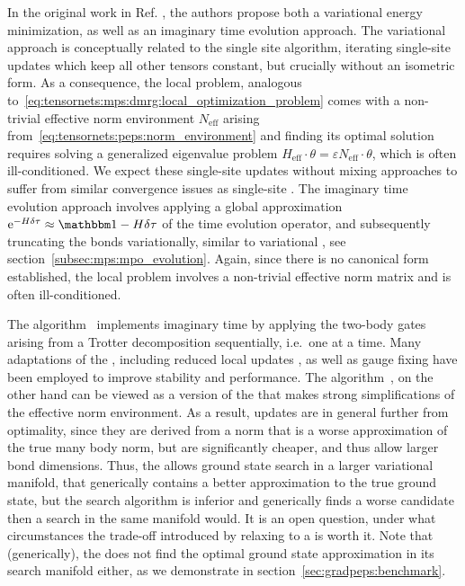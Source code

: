 In the original  work in Ref. \cite{verstraete2004}, the authors propose both a  variational energy minimization, as well as an imaginary time evolution approach.
%
The variational approach is conceptually related to the single site  algorithm, iterating single-site updates which keep all other tensors constant, but crucially without an isometric form.
%
As a consequence, the local problem, analogous to~\eqref{eq:tensornets:mps:dmrg:local_optimization_problem} comes with a non-trivial effective norm environment $N_\text{eff}$ arising from~\eqref{eq:tensornets:peps:norm_environment} and finding its optimal solution requires solving a generalized eigenvalue problem $H_\text{eff} \cdot \theta = \varepsilon N_\text{eff} \cdot \theta$, which is often ill-conditioned.
%
We expect these single-site updates without mixing approaches to suffer from similar convergence issues as single-site .
%
The imaginary time evolution approach involves applying a global approximation $\eto{-H\delta\tau} \approx \eye - H \delta\tau$ of the time evolution operator, and subsequently truncating the  bonds variationally, similar to variational , see section~\ref{subsec:mps:mpo_evolution}.
%
Again, since there is no canonical form established, the local problem involves a non-trivial effective norm matrix and is often ill-conditioned.



The  algorithm~\cite{jordan2008} implements imaginary time by applying the two-body gates arising from a Trotter decomposition sequentially, i.e.~one at a time.
%
Many adaptations of the , including reduced local updates \cite{corboz2010, lubasch2014a}, as well as gauge fixing \cite{lubasch2014, phien2015} have been employed to improve stability and performance.
%
The  algorithm~\cite{jiang2008}, on the other hand can be viewed as a version of the  that makes strong simplifications of the effective norm environment.
%
As a result, updates are in general further from optimality, since they are derived from a norm that is a worse approximation of the true many body norm, but are significantly cheaper, and thus allow larger bond dimensions.
%
Thus, the  allows ground state search in a larger variational manifold, that generically contains a better approximation to the true ground state, but the search algorithm is inferior and generically finds a worse candidate then a  search in the same manifold would.
%
It is an open question, under what circumstances the trade-off introduced by relaxing to a  is worth it.
%
Note that (generically), the  does not find the optimal ground state approximation in its search manifold either, as we demonstrate in section~\ref{sec:gradpeps:benchmark}.


